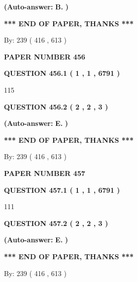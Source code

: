 \documentclass[12pt]{article}
\begin{document}
 
{\textbf{(Auto-answer:}}
{\textbf{\large{
B.}}}
{\textbf{)}}
 
 
   
   
   
   
\vspace{1.0in} 
{\textbf{\large{ *** END OF PAPER, THANKS *** }}} 
   
   
\hspace{1.0in} By: 
 239 ( 416 ,  613 )
   
   
   
   
\newpage 
\setcounter{page}{ 
   456001 } 
   
   
 {\textbf{ \Large{ PAPER NUMBER  456  }}}
   
   
   
   
  
  
{\textbf{\large{QUESTION
456.1 
 ( 1 , 1 , 6791 )
}}}

115
  
  
{\textbf{\large{QUESTION
456.2 
 ( 2 , 2 , 3 )
}}}
 
 
{\textbf{(Auto-answer:}}
{\textbf{\large{
E.}}}
{\textbf{)}}
 
 
   
   
   
   
\vspace{1.0in} 
{\textbf{\large{ *** END OF PAPER, THANKS *** }}} 
   
   
\hspace{1.0in} By: 
 239 ( 416 ,  613 )
   
   
   
   
\newpage 
\setcounter{page}{ 
   457001 } 
   
   
 {\textbf{ \Large{ PAPER NUMBER  457  }}}
   
   
   
   
  
  
{\textbf{\large{QUESTION
457.1 
 ( 1 , 1 , 6791 )
}}}

111
  
  
{\textbf{\large{QUESTION
457.2 
 ( 2 , 2 , 3 )
}}}
 
 
{\textbf{(Auto-answer:}}
{\textbf{\large{
E.}}}
{\textbf{)}}
 
 
   
   
   
   
\vspace{1.0in} 
{\textbf{\large{ *** END OF PAPER, THANKS *** }}} 
   
   
\hspace{1.0in} By: 
 239 ( 416 ,  613 )
   
   
   
\end{document}
